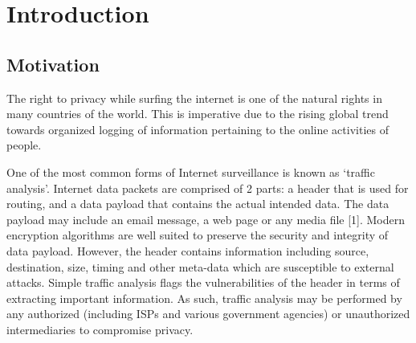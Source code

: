 \documentclass{article}
\begin{document}
\newpage

\newpage
\tableofcontents
\newpage

\listoffigures
\newpage

\section{Introduction}
\subsection{Motivation}
The right to privacy while surfing the internet is one of the natural rights in many countries of the world. This is imperative due to the rising global trend towards organized logging of information pertaining to the online activities of people. \\

\vspace{0.3 cm}

\noindent One of the most common forms of Internet surveillance is known as ‘traffic analysis’. Internet data packets are comprised of 2 parts: a header that is used for routing, and a data payload that contains the actual intended data. The data payload may include an email message, a web page or any media file [1]. Modern encryption algorithms are well suited to preserve the security and integrity of data payload. However, the header contains information including source, destination, size, timing and other meta-data which are susceptible to external attacks. Simple traffic analysis flags the vulnerabilities of the header in terms of extracting important information. As such, traffic analysis may be performed by any authorized (including ISPs and various government agencies) or unauthorized intermediaries to compromise privacy. \\
\end{document}
